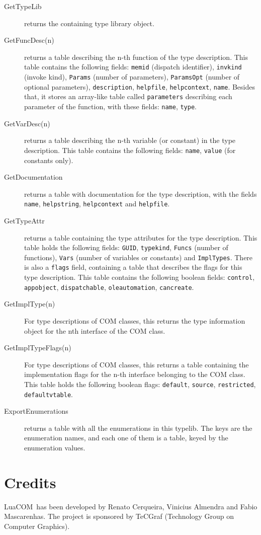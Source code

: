 \documentclass[11pt,a4paper,english]{report}
\newcommand{\ident}[1]{\mbox{\texttt{#1}}}
\newcommand{\techname}[1]{\mbox{#1}}
\newcommand{\luacom}{\techname{LuaCOM}}
\begin{document}
\begin{description}

\item[GetTypeLib] returns the containing type library object.

\item[GetFuncDesc(n)] returns a table describing the n-th function of
the type description. This table contains the following fields:
\ident{memid} (dispatch identifier), \ident{invkind} (invoke kind),
\ident{Params} (number of parameters), \ident{ParamsOpt} (number of
optional parameters), \ident{description}, \ident{helpfile},
\ident{helpcontext}, \ident{name}. Besides that, it stores an
array-like table called \ident{parameters} describing each parameter
of the function, with these fields: \ident{name}, \ident{type}.


\item[GetVarDesc(n)] returns a table describing the n-th variable (or
constant) in the type description. This table contains the following
fields: \ident{name}, \ident{value} (for constants only).

\item[GetDocumentation] returns a table with documentation for the type
description, with the fields \ident{name}, \ident{helpstring},
\ident{helpcontext} and \ident{helpfile}.

\item[GetTypeAttr] returns a table containing the type attributes for
the type description. This table holds the following fields:
\ident{GUID}, \ident{typekind}, \ident{Funcs} (number of functions),
\ident{Vars} (number of variables or constants) and \ident{ImplTypes}.
There is also a \ident{flags} field, containing a table that describes
the flags for this type description. This table contains the following
boolean fields: \ident{control}, \ident{appobject}, \ident{dispatchable},
\ident{oleautomation}, \ident{cancreate}.

\item[GetImplType(n)] For type descriptions of COM classes, this
returns the type information object for the nth interface of the COM
class.

\item[GetImplTypeFlags(n)] For type descriptions of COM classes, this
returns a table containing the implementation flags for the n-th
interface belonging to the COM class. This table holds the following
boolean flags: \ident{default}, \ident{source}, \ident{restricted},
\ident{defaultvtable}.

\item[ExportEnumerations] returns a table with all the enumerations in this typelib.
The keys are the enumeration names, and each one of them is a table, keyed by the
enumeration values.
\end{description}


\chapter{Credits}
\luacom\ has been developed by Renato Cerqueira, Vinicius
Almendra and Fabio Mascarenhas. The project is sponsored by TeCGraf (Technology Group
on Computer Graphics).
\end{document}
